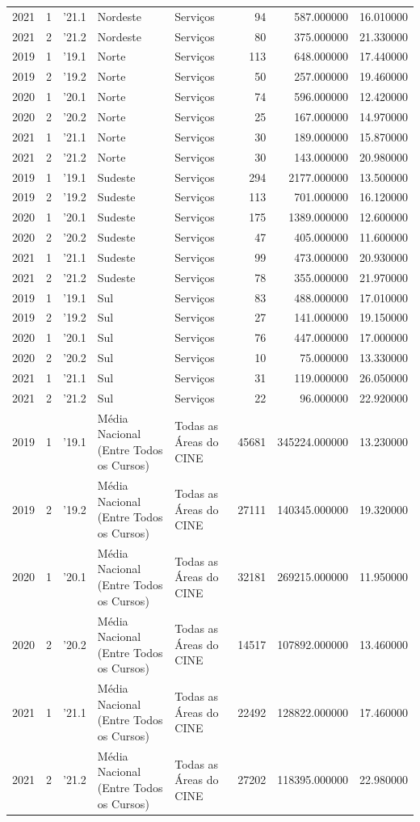 \begin{longtable}{rrlllrrr}
2021 & 1 & '21.1 & Nordeste & Serviços & 94 & 587.000000 & 16.010000 \\
2021 & 2 & '21.2 & Nordeste & Serviços & 80 & 375.000000 & 21.330000 \\
2019 & 1 & '19.1 & Norte & Serviços & 113 & 648.000000 & 17.440000 \\
2019 & 2 & '19.2 & Norte & Serviços & 50 & 257.000000 & 19.460000 \\
2020 & 1 & '20.1 & Norte & Serviços & 74 & 596.000000 & 12.420000 \\
2020 & 2 & '20.2 & Norte & Serviços & 25 & 167.000000 & 14.970000 \\
2021 & 1 & '21.1 & Norte & Serviços & 30 & 189.000000 & 15.870000 \\
2021 & 2 & '21.2 & Norte & Serviços & 30 & 143.000000 & 20.980000 \\
2019 & 1 & '19.1 & Sudeste & Serviços & 294 & 2177.000000 & 13.500000 \\
2019 & 2 & '19.2 & Sudeste & Serviços & 113 & 701.000000 & 16.120000 \\
2020 & 1 & '20.1 & Sudeste & Serviços & 175 & 1389.000000 & 12.600000 \\
2020 & 2 & '20.2 & Sudeste & Serviços & 47 & 405.000000 & 11.600000 \\
2021 & 1 & '21.1 & Sudeste & Serviços & 99 & 473.000000 & 20.930000 \\
2021 & 2 & '21.2 & Sudeste & Serviços & 78 & 355.000000 & 21.970000 \\
2019 & 1 & '19.1 & Sul & Serviços & 83 & 488.000000 & 17.010000 \\
2019 & 2 & '19.2 & Sul & Serviços & 27 & 141.000000 & 19.150000 \\
2020 & 1 & '20.1 & Sul & Serviços & 76 & 447.000000 & 17.000000 \\
2020 & 2 & '20.2 & Sul & Serviços & 10 & 75.000000 & 13.330000 \\
2021 & 1 & '21.1 & Sul & Serviços & 31 & 119.000000 & 26.050000 \\
2021 & 2 & '21.2 & Sul & Serviços & 22 & 96.000000 & 22.920000 \\
2019 & 1 & '19.1 & Média Nacional (Entre Todos os Cursos) & Todas as Áreas do CINE & 45681 & 345224.000000 & 13.230000 \\
2019 & 2 & '19.2 & Média Nacional (Entre Todos os Cursos) & Todas as Áreas do CINE & 27111 & 140345.000000 & 19.320000 \\
2020 & 1 & '20.1 & Média Nacional (Entre Todos os Cursos) & Todas as Áreas do CINE & 32181 & 269215.000000 & 11.950000 \\
2020 & 2 & '20.2 & Média Nacional (Entre Todos os Cursos) & Todas as Áreas do CINE & 14517 & 107892.000000 & 13.460000 \\
2021 & 1 & '21.1 & Média Nacional (Entre Todos os Cursos) & Todas as Áreas do CINE & 22492 & 128822.000000 & 17.460000 \\
2021 & 2 & '21.2 & Média Nacional (Entre Todos os Cursos) & Todas as Áreas do CINE & 27202 & 118395.000000 & 22.980000 \\
\end{longtable}
